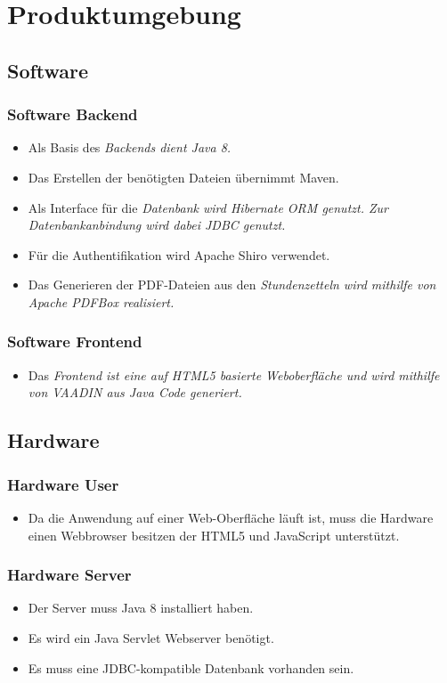 \section{Produktumgebung}

\subsection{Software}
\subsubsection{Software Backend}
\begin{itemize}
    \item Als Basis des \em{Backends} dient Java 8.
    \item Das Erstellen der benötigten Dateien übernimmt Maven.
    \item Als Interface für die \em{Datenbank} wird Hibernate ORM genutzt.
            Zur Datenbankanbindung wird dabei JDBC genutzt.
    \item Für die Authentifikation wird Apache Shiro verwendet.
    \item Das Generieren der PDF-Dateien aus den \em{Stundenzetteln} wird mithilfe von Apache PDFBox realisiert.
\end{itemize}

\subsubsection{Software Frontend}
\begin{itemize}
    \item Das \em{Frontend} ist eine auf HTML5 basierte Weboberfläche und wird mithilfe von VAADIN aus Java Code generiert.
\end{itemize}

\subsection{Hardware}
\subsubsection{Hardware User}
\begin{itemize}
    \item Da die Anwendung auf einer Web-Oberfläche läuft ist, muss die Hardware einen Webbrowser besitzen der HTML5 und JavaScript unterstützt.
\end{itemize}

\subsubsection{Hardware Server}
\begin{itemize}
    \item Der Server muss Java 8 installiert haben.
    \item Es wird ein Java Servlet Webserver benötigt.
    \item Es muss eine JDBC-kompatible Datenbank vorhanden sein.
\end{itemize}
